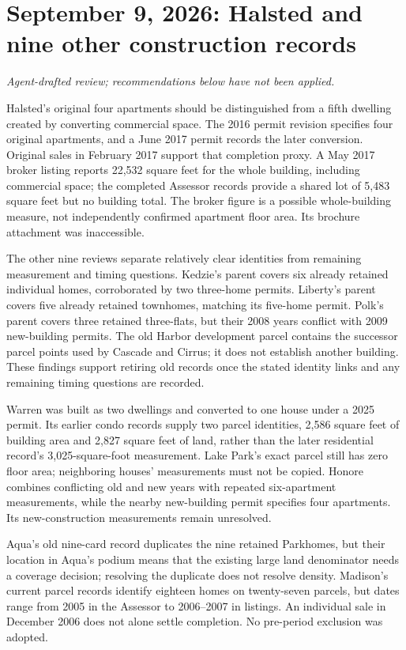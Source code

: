 \clearpage
\section*{September 9, 2026: Halsted and nine other construction records}
\textit{Agent-drafted review; recommendations below have not been applied.}

Halsted's original four apartments should be distinguished from a fifth dwelling created by converting commercial space. The 2016 permit revision specifies four original apartments, and a June 2017 permit records the later conversion. Original sales in February 2017 support that completion proxy. A May 2017 broker listing reports 22,532 square feet for the whole building, including commercial space; the completed Assessor records provide a shared lot of 5,483 square feet but no building total. The broker figure is a possible whole-building measure, not independently confirmed apartment floor area. Its brochure attachment was inaccessible.

The other nine reviews separate relatively clear identities from remaining measurement and timing questions. Kedzie's parent covers six already retained individual homes, corroborated by two three-home permits. Liberty's parent covers five already retained townhomes, matching its five-home permit. Polk's parent covers three retained three-flats, but their 2008 years conflict with 2009 new-building permits. The old Harbor development parcel contains the successor parcel points used by Cascade and Cirrus; it does not establish another building. These findings support retiring old records once the stated identity links and any remaining timing questions are recorded.

Warren was built as two dwellings and converted to one house under a 2025 permit. Its earlier condo records supply two parcel identities, 2,586 square feet of building area and 2,827 square feet of land, rather than the later residential record's 3,025-square-foot measurement. Lake Park's exact parcel still has zero floor area; neighboring houses' measurements must not be copied. Honore combines conflicting old and new years with repeated six-apartment measurements, while the nearby new-building permit specifies four apartments. Its new-construction measurements remain unresolved.

Aqua's old nine-card record duplicates the nine retained Parkhomes, but their location in Aqua's podium means that the existing large land denominator needs a coverage decision; resolving the duplicate does not resolve density. Madison's current parcel records identify eighteen homes on twenty-seven parcels, but dates range from 2005 in the Assessor to 2006--2007 in listings. An individual sale in December 2006 does not alone settle completion. No pre-period exclusion was adopted.


